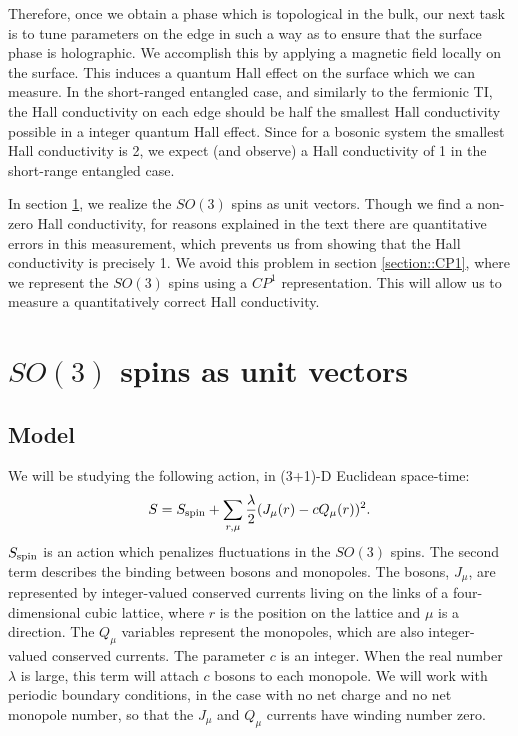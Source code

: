 \documentclass[prb,twocolumn]{revtex4}
\begin{document}
Therefore, once we obtain a phase which is topological in the bulk, our next task is to tune parameters on the edge in such a way as to ensure that the surface phase is holographic. We accomplish this by applying a magnetic field locally on the surface. This induces a quantum Hall effect on the surface which we can measure. In the short-ranged entangled case, and similarly to the fermionic TI, the Hall conductivity on each edge should be half the smallest Hall conductivity possible in a integer quantum Hall effect. Since for a bosonic system the smallest Hall conductivity is 2, we expect (and observe) a Hall conductivity of 1 in the short-range entangled case. 

In section \ref{section::Heisenberg}, we realize the $SO(3)$ spins as unit vectors. Though we find a non-zero Hall conductivity, for reasons explained in the text there are quantitative errors in this measurement, which prevents us from showing that the Hall conductivity is precisely 1. We avoid this problem in section \ref{section::CP1}, where we represent the $SO(3)$ spins using a $CP^1$ representation. This will allow us to measure a quantitatively correct Hall conductivity.

\section{$SO(3)$ spins as unit vectors}
\label{section::Heisenberg}

\subsection{Model}
We will be studying the following action, in (3+1)-D Euclidean space-time:
\begin{equation}
S=S_{\rm spin}+\sum_{r,\mu} \frac{\lambda}{2}( J_\mu(r)-c Q_\mu(r))^2.
\label{action}
\end{equation}
$S_{\rm spin}$ is an action which penalizes fluctuations in the $SO(3)$ spins. The second term describes the binding between bosons and monopoles. The bosons, $J_\mu$, are represented by integer-valued conserved currents living on the links of a four-dimensional cubic lattice, where $r$ is the position on the lattice and $\mu$ is a direction. The $Q_\mu$ variables represent the monopoles, which are also integer-valued conserved currents. The parameter $c$ is an integer. When the real number $\lambda$ is large, this term will attach $c$ bosons to each monopole. We will work with periodic boundary conditions, in the case with no net charge and no net monopole number, so that the $J_\mu$ and $Q_\mu$ currents have winding number zero.
\end{document}
